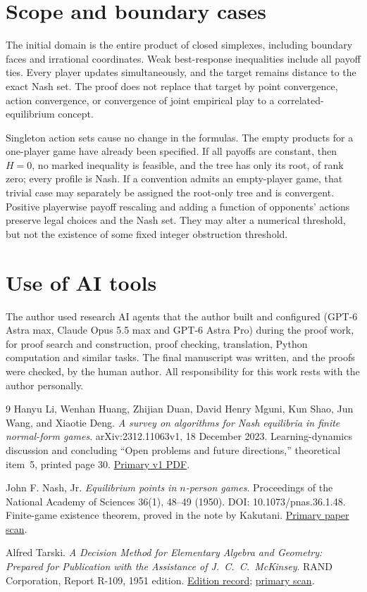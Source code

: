\documentclass[11pt,a4paper]{article}
\theoremstyle{definition}
\begin{document}
\section{Scope and boundary cases}

The initial domain is the entire product of closed simplexes, including
boundary faces and irrational coordinates. Weak best-response inequalities
include all payoff ties. Every player updates simultaneously, and the
target remains distance to the exact Nash set. The proof does not replace
that target by point convergence, action convergence, or convergence of
joint empirical play to a correlated-equilibrium concept.

Singleton action sets cause no change in the formulas. The empty products
for a one-player game have already been specified. If all payoffs are
constant, then $H=0$, no marked inequality is feasible, and the tree has
only its root, of rank zero; every profile is Nash. If a convention admits
an empty-player game, that trivial case may separately be assigned the
root-only tree and is convergent. Positive playerwise payoff rescaling and
adding a function of opponents' actions preserve legal choices and the
Nash set. They may alter a numerical threshold, but not the existence of
some fixed integer obstruction threshold.

\section*{Use of AI tools}
The author used research AI agents that the author built and configured (GPT-6 Astra max,
Claude Opus 5.5 max and GPT-6 Astra Pro) during the proof work, for proof search and
construction, proof checking, translation, Python computation and similar tasks. The final
manuscript was written, and the proofs were checked, by the human author. All responsibility
for this work rests with the author personally.

\begin{thebibliography}{9}
Hanyu Li, Wenhan Huang, Zhijian Duan, David Henry Mguni, Kun Shao,
Jun Wang, and Xiaotie Deng.
\emph{A survey on algorithms for Nash equilibria in finite normal-form
games}. arXiv:2312.11063v1, 18 December 2023.
Learning-dynamics discussion and concluding ``Open problems and future
directions,'' theoretical item~5, printed page 30.
\href{https://arxiv.org/pdf/2312.11063v1}{Primary v1 PDF}.

John F. Nash, Jr.
\emph{Equilibrium points in $n$-person games}.
Proceedings of the National Academy of Sciences 36(1), 48--49 (1950).
DOI: 10.1073/pnas.36.1.48. Finite-game existence theorem, proved in the
note by Kakutani.
\href{https://pmc.ncbi.nlm.nih.gov/articles/PMC1063129/}{Primary paper scan}.

Alfred Tarski.
\emph{A Decision Method for Elementary Algebra and Geometry:
Prepared for Publication with the Assistance of J.~C.~C.~McKinsey}.
RAND Corporation, Report R-109, 1951 edition.
\href{https://www.rand.org/pubs/reports/R109.html}{Edition record}; \href{https://www.rand.org/content/dam/rand/pubs/reports/2008/R109.pdf}{primary scan}.
\end{thebibliography}
\end{document}
